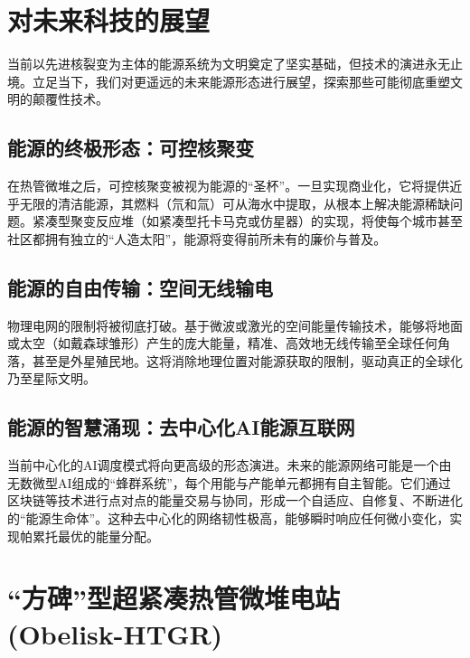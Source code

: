 \section{对未来科技的展望}\label{ux5bf9ux672aux6765ux79d1ux6280ux7684ux5c55ux671b}

当前以先进核裂变为主体的能源系统为文明奠定了坚实基础，但技术的演进永无止境。立足当下，我们对更遥远的未来能源形态进行展望，探索那些可能彻底重塑文明的颠覆性技术。

\subsection{能源的终极形态：可控核聚变}\label{ux80fdux6e90ux7684ux7ec8ux6781ux5f62ux6001ux53efux63a7ux6838ux805aux53d8}

在热管微堆之后，可控核聚变被视为能源的``圣杯''。一旦实现商业化，它将提供近乎无限的清洁能源，其燃料（氘和氚）可从海水中提取，从根本上解决能源稀缺问题。紧凑型聚变反应堆（如紧凑型托卡马克或仿星器）的实现，将使每个城市甚至社区都拥有独立的``人造太阳''，能源将变得前所未有的廉价与普及。

\subsection{能源的自由传输：空间无线输电}\label{ux80fdux6e90ux7684ux81eaux7531ux4f20ux8f93ux7a7aux95f4ux65e0ux7ebfux8f93ux7535}

物理电网的限制将被彻底打破。基于微波或激光的空间能量传输技术，能够将地面或太空（如戴森球雏形）产生的庞大能量，精准、高效地无线传输至全球任何角落，甚至是外星殖民地。这将消除地理位置对能源获取的限制，驱动真正的全球化乃至星际文明。

\subsection{能源的智慧涌现：去中心化AI能源互联网}\label{ux80fdux6e90ux7684ux667aux6167ux6d8cux73b0ux53bbux4e2dux5fc3ux5316aiux80fdux6e90ux4e92ux8054ux7f51}

当前中心化的AI调度模式将向更高级的形态演进。未来的能源网络可能是一个由无数微型AI组成的``蜂群系统''，每个用能与产能单元都拥有自主智能。它们通过区块链等技术进行点对点的能量交易与协同，形成一个自适应、自修复、不断进化的``能源生命体''。这种去中心化的网络韧性极高，能够瞬时响应任何微小变化，实现帕累托最优的能量分配。

\section{``方碑''型超紧凑热管微堆电站 (Obelisk-HTGR)}\label{ux65b9ux7891ux578bux8d85ux7d27ux51d1ux70edux7ba1ux5faeux5806ux7535ux7ad9-obelisk-htgr}

